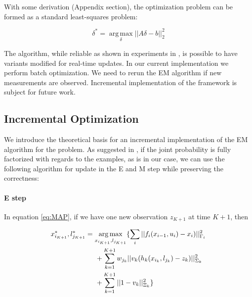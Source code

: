 With some derivation %
(Appendix section), the optimization problem can be formed as a standard least-squares problem:


\begin{equation}
\delta^* = \operatorname*{arg\,max}_\delta||A\delta - b||_2^2
\label{eq:optimization}
\end{equation}


The algorithm, while reliable as shown in experiments in \cite{haehnel03iros}, is possible to have variants modified for real-time updates. In our current implementation we perform batch optimization. We need to rerun the EM algorithm if new measurements are observed. Incremental implementation of the framework is subject for future work.

\subsection{Incremental Optimization}
We introduce the theoretical basis for an incremental implementation of the EM algorithm for the problem. As suggested in \cite{neal1998EM}, if the joint probability is fully factorized with regards to the examples, as is in our case, we can use the following algorithm for update in the E and M step while preserving the correctness:

\paragraph{E step} 
In equation \ref{eq:MAP}, if we have one new observation $z_{K+1}$ at time $K+1$, then

\begin{equation}
\begin{aligned}
x_{i_{K+1}}^*, l_{j_{K+1}}^*  
&= \operatorname*{arg\,max}_{ x_{i_{K+1}}, l_{j_{K+1}}} \{ 
\sum_{i}||f_i(x_{i-1}, u_i) - x_i)||^2_{\Gamma_i} \\
&\hspace{0.5cm}+ \sum_{k=1}^{K+1} w_{j_k}||v_k(h_k(x_{i_k}, l_{j_k}) - z_k)||^2_{\Sigma_k} \\ 
&\hspace{0.5cm}+ \sum_{k=1}^{K+1}||1-v_k||^2_{\Xi_k} \}
\end{aligned}
\label{eq:facMAP}
\end{equation}

